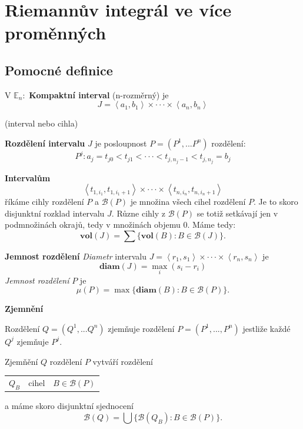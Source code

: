 \documentclass[10pt]{article}
\begin{document}
\section{Riemannův integrál ve více proměnných}
\subsection{Pomocné definice}
\hspace{1.2mm}
V $\mathbb{E}_n:$ \textbf{Kompaktní interval} (n-rozměrný) je 
\[J = \left<a_1,b_1\right> \times \cdot \cdot \cdot \times \left<a_n,b_n\right>\]
\begin{center}
(interval nebo cihla)
\end{center}
\hspace{1.2mm}
\textbf{Rozdělení intervalu} $J$ je posloupnost $P = (P^1,...P^n)$ rozdělení:
\[P^j : a_j = t_{j0} < t_{j1} < \cdot \cdot \cdot < t_{j,n_j-1} < t_{j,n_j} = b_j\]

\noindent
\hspace{1.2mm}
\textbf{Intervalům}
\[\left<t_{1,i_1},t_{1,i_1+1}\right> \times \cdot \cdot \cdot \times \left<t_{n,i_n},t_{n,i_n+1}\right>\]
říkáme cihly rozdělení $P$ a $\mathcal{B}(P)$ je množina všech cihel rozdělení $P$. Je to skoro disjunktní rozklad intervalu $J$.
Různe cihly z $\mathcal{B}(P)$ se totiž setkávají jen v podmnožinách okrajů, tedy v množinách objemu 0. Máme tedy:
\[\textbf{vol}(J) = \sum \{\textbf{vol}(B) : B \in \mathcal{B}(J)\}.\]

\textbf{Jemnost rozdělení}
\textit{Diametr} intervalu $J = \left<r_1,s_1\right> \times \cdot \cdot \cdot \times \left<r_n,s_n\right>$ je 
\[\textbf{diam}(J) = \max_i (s_i - r_i)\]
\textit{Jemnost rozdělení} $P$ je 
\[\mu(P) = \max \{\textbf{diam}(B) : B \in \mathcal{B}(P)\}.\]

\textbf{Zjemnění}

Rozdělení $Q = (Q^1,...Q^n) $ zjemňuje rozdělení $P = (P^1,...,P^n)$ jestliže každé $Q^j$ zjemňuje $P^j$.

Zjemňění $Q$ rozdělení $P$ vytváří rozdělení
\begin{tabular}{c c c}
     $Q_B$ & cihel & $B \in \mathcal{B}(P)$  
\end{tabular}
a máme skoro disjunktní sjednocení 
\[\mathcal{B}(Q) = \bigcup \{\mathcal{B}(Q_B) : B \in \mathcal{B}(P)\}.\]
\end{document}
